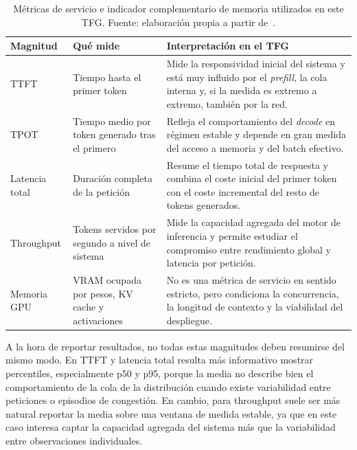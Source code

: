 \begin{table}[H]
\centering
\caption{Métricas de servicio e indicador complementario de memoria utilizados en este TFG. Fuente: elaboración propia a partir de~\cite{vllm2023, vllm-docs}.}
\label{tab:metricas-servicio}
\footnotesize
\begin{tabularx}{\textwidth}{>{\raggedright\arraybackslash}p{2.6cm} >{\raggedright\arraybackslash}X >{\raggedright\arraybackslash}p{4.6cm}}
\toprule
\textbf{Magnitud} & \textbf{Qué mide} & \textbf{Interpretación en el TFG} \\
\midrule
TTFT & Tiempo hasta el primer token & Mide la responsividad inicial del sistema y está muy influido por el \textit{prefill}, la cola interna y, si la medida es extremo a extremo, también por la red. \\
\addlinespace
TPOT & Tiempo medio por token generado tras el primero & Refleja el comportamiento del \textit{decode} en régimen estable y depende en gran medida del acceso a memoria y del batch efectivo. \\
\addlinespace
Latencia total & Duración completa de la petición & Resume el tiempo total de respuesta y combina el coste inicial del primer token con el coste incremental del resto de tokens generados. \\
\addlinespace
Throughput & Tokens servidos por segundo a nivel de sistema & Mide la capacidad agregada del motor de inferencia y permite estudiar el compromiso entre rendimiento global y latencia por petición. \\
\addlinespace
Memoria GPU & VRAM ocupada por pesos, KV cache y activaciones & No es una métrica de servicio en sentido estricto, pero condiciona la concurrencia, la longitud de contexto y la viabilidad del despliegue. \\
\bottomrule
\end{tabularx}
\end{table}

A la hora de reportar resultados, no todas estas magnitudes deben resumirse del mismo modo. En TTFT y latencia total resulta más informativo mostrar percentiles, especialmente p50 y p95, porque la media no describe bien el comportamiento de la cola de la distribución cuando existe variabilidad entre peticiones o episodios de congestión. En cambio, para throughput suele ser más natural reportar la media sobre una ventana de medida estable, ya que en este caso interesa captar la capacidad agregada del sistema más que la variabilidad entre observaciones individuales.

